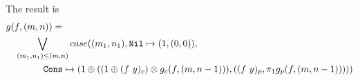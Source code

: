 The result is 
\begin{equation*}
  \begin{split}
  &g(f, (m, n)) = \\
  &\quad \bigvee\limits_{(m_1, n_1) \leq (m, n)} case((m_1, n_1), \texttt{Nil} \mapsto (1, (0, 0)), \\
  &\qquad\quad\quad \texttt{Cons} \mapsto (1 \oplus ((1 \oplus (f\ y)_c) \otimes g_c(f, (m, n-1))), ((f\ y)_p, \pi_1 g_p(f, (m, n-1))))) 
  \end{split}
\end{equation*}

%

